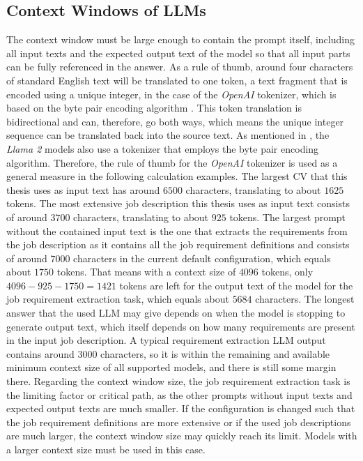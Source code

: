 \documentclass[draft,final]{thesisclass} %
\begin{document}
\subsection{Context Windows of \gls{LLM}s}
The context window must be large enough to contain the prompt itself, including all input texts and the expected output text of the model so that all input parts can be fully referenced in the answer.
As a rule of thumb, around four characters of standard English text will be translated to one token, a text fragment that is encoded using a unique integer, in the case of the \textit{OpenAI} tokenizer, which is based on the byte pair encoding algorithm \parencite{openai_tokenizer}.
This token translation is bidirectional and can, therefore, go both ways, which means the unique integer sequence can be translated back into the source text.
As mentioned in \textcite[6]{llama2}, the \textit{Llama 2} models also use a tokenizer that employs the byte pair encoding algorithm. Therefore, the rule of thumb for the \textit{OpenAI} tokenizer is used as a general measure in the following calculation examples.
The largest \acs{CV} that this thesis uses as input text has around $6500$ characters, translating to about $1625$ tokens.
The most extensive job description this thesis uses as input text consists of around $3700$ characters, translating to about $925$ tokens.
The largest prompt without the contained input text is the one that extracts the requirements from the job description as it contains all the job requirement definitions and consists of around $7000$ characters in the current default configuration, which equals about $1750$ tokens.
That means with a context size of $4096$ tokens, only $4096-925-1750=1421$ tokens are left for the output text of the model for the job requirement extraction task, which equals about $5684$ characters.
The longest answer that the used \gls{LLM} may give depends on when the model is stopping to generate output text, which itself depends on how many requirements are present in the input job description.
A typical requirement extraction \gls{LLM} output contains around $3000$ characters, so it is within the remaining and available minimum context size of all supported models, and there is still some margin there.
Regarding the context window size, the job requirement extraction task is the limiting factor or critical path, as the other prompts without input texts and expected output texts are much smaller.
If the configuration is changed such that the job requirement definitions are more extensive or if the used job descriptions are much larger, the context window size may quickly reach its limit. Models with a larger context size must be used in this case.
\end{document}
